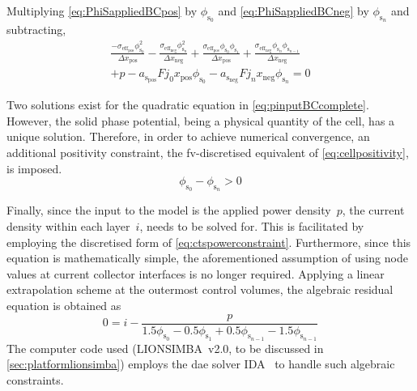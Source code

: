     Multiplying    \cref{eq:PhiSappliedBCpos}    by   $\phi_{\text{s}_0}$    and
    \cref{eq:PhiSappliedBCneg} by $\phi_{\text{s}_n}$ and subtracting,
    \begin{multline} \label{eq:pinputBCcomplete}
        \frac{-\sigma_{\text{eff}_\text{pos}} \phi^2_{\text{s}_0}}{\Delta x_\text{pos}} -
        \frac{\sigma_{\text{eff}_\text{neg}} \phi^2_{\text{s}_n}}{\Delta x_\text{neg}} +
        \frac{\sigma_{\text{eff}_\text{pos}} \phi_{\text{s}_0} \phi_{\text{s}_1}}{\Delta x_\text{pos}} +
        \frac{\sigma_{\text{eff}_\text{neg}} \phi_{\text{s}_n} \phi_{\text{s}_{n-1}}}{\Delta x_\text{neg}} \\+ p -
        a_{\text{s}_\text{pos}} F j_0 x_\text{pos} \phi_{\text{s}_0} - a_{\text{s}_\text{neg}} F j_n x_\text{neg}
        \phi_{\text{s}_n} = 0
    \end{multline}


    Two     solutions     exist     for    the     quadratic     equation     in
    \cref{eq:pinputBCcomplete}.  However, the  solid  phase  potential, being  a
    physical quantity of the cell, has a unique solution. Therefore, in order to
    achieve  numerical convergence,  an  additional  positivity constraint,  the
    \gls{fv}-discretised equivalent of \cref{eq:cellpositivity}, is imposed.
    \begin{equation}\label{eq:discpositivity}
	    \phi_{\text{s}_0} - \phi_{\text{s}_n} > 0
    \end{equation}

    Finally,   since   the  input   to   the   model   is  the   applied   power
    density~$p$,  the  current  density  within  each  layer~$i$,  needs  to  be
    solved  for.  This   is  facilitated  by  employing   the  discretised  form
    of  \cref{eq:ctspowerconstraint}.   Furthermore,  since  this   equation  is
    mathematically simple, the aforementioned assumption of using node values at
    current  collector  interfaces is  no  longer  required. Applying  a  linear
    extrapolation  scheme  at  the  outermost  control  volumes,  the  algebraic
    residual equation is obtained as
    \begin{equation}\label{eq:currdensityresidual}
        0 = i - \frac{p}{1.5 \phi_{\mathrm{s}_0} - 0.5 \phi_{\mathrm{s}_1} + 0.5 \phi_{\mathrm{s}_{n-1}} - 1.5 \phi_{\mathrm{s}_{n-1}}}
    \end{equation}
    The    computer    code    used    (LIONSIMBA~v2.0,    to    be    discussed
    in    \cref{sec:platformlionsimba})    employs    the    \gls{dae}    solver
    IDA~\cite{sundials2005} to handle such algebraic constraints.

